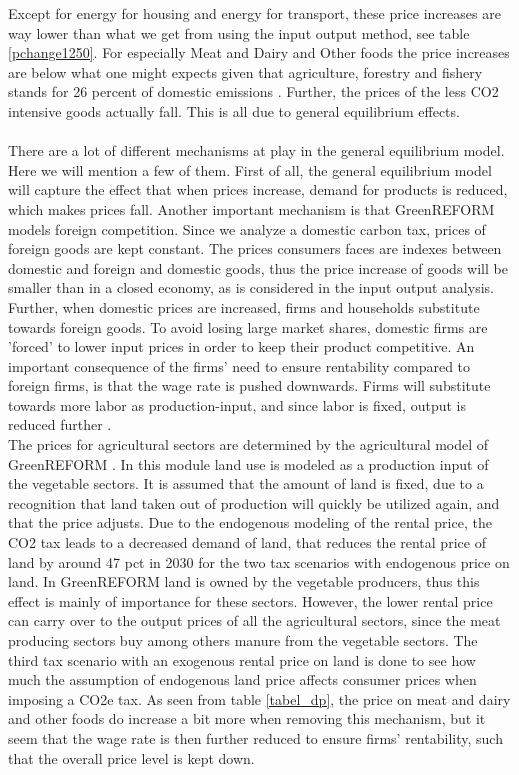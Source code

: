 Except for energy for housing and energy for transport, these price increases are way lower than what we get from using the input output method, see table \ref{pchange1250}. For especially Meat and Dairy and Other foods the price increases are below what one might expects given that agriculture, forestry and fishery stands for 26 percent of domestic emissions \citep[Table DRIVHUS]{statbank}. Further, the prices of the less CO2 intensive goods actually fall. This is all due to general equilibrium effects.
\\
\\
There are a lot of different mechanisms at play in the general equilibrium model. Here we will mention a few of them. First of all, the general equilibrium model will capture the effect that when prices increase, demand for products is reduced, which makes prices fall. Another important mechanism is that GreenREFORM models foreign competition. Since we analyze a domestic carbon tax, prices of foreign goods are kept constant. The prices consumers faces are indexes between domestic and foreign and domestic goods, thus the price increase of goods will be smaller than in a closed economy, as is considered in the input output analysis. Further, when domestic prices are increased, firms and households substitute towards foreign goods. To avoid losing large market shares, domestic firms are 'forced' to lower input prices in order to keep their product competitive.
An important consequence of the firms' need to ensure rentability compared to foreign firms, is that the wage rate is pushed downwards. Firms will substitute towards more labor as production-input, and since labor is fixed, output is reduced further \citep{Simpel_co2skat}.
\\
 
The prices for agricultural sectors are determined by the agricultural model of GreenREFORM \citep{GR_landbrug}. In this module land use is modeled as a production input of the vegetable sectors. It is assumed that the amount of land is fixed, due to a recognition that land taken out of production will quickly be utilized again, and that the price adjusts. Due to the endogenous modeling of the rental price, the CO2 tax leads to a decreased demand of land, that reduces the rental price of land by around 47 pct in 2030 for the two tax scenarios with endogenous price on land. In GreenREFORM land is owned by the vegetable producers, thus this effect is mainly of importance for these sectors. However, the lower rental price can carry over to the output prices of all the agricultural sectors, since the meat producing sectors buy among others manure from the vegetable sectors. The third tax scenario with an exogenous rental price on land is done to see how much the assumption of endogenous land price affects consumer prices when imposing a CO2e tax. As seen from table \ref{tabel_dp}, the price on meat and dairy and other foods do increase a bit more when removing this mechanism, but it seem that the wage rate is then further reduced to ensure firms' rentability, such that the overall price level is kept down.

